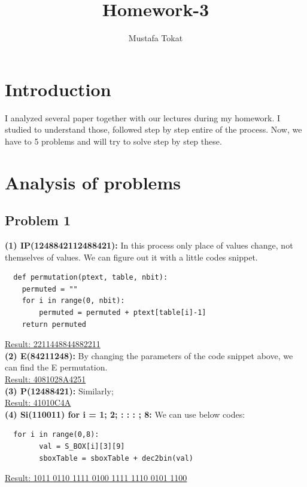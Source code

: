 \documentclass[11pt]{article}
\begin{document}
\title{Homework-3}
\author{Mustafa Tokat}
\maketitle
\section{Introduction}
I analyzed several paper together with our lectures during my homework. I studied to understand those, followed step by step entire of the process.
 Now, we have to 5 problems and will try to solve step by step these.
\section{Analysis of problems}
\subsection{Problem 1}
 
\textbf{(1) IP(1248842112488421):}
In this process only place of values change, not themselves of values. We can figure out it with a little codes snippet.
\lstset{language=Python}
\lstset{frame=lines}
\lstset{basicstyle=\footnotesize}
\begin{lstlisting}
  def permutation(ptext, table, nbit):
    permuted = ""
    for i in range(0, nbit):
        permuted = permuted + ptext[table[i]-1]
    return permuted
\end{lstlisting}
\underline{Result: 2211448844882211 }\\

\bigskip\textbf{(2) E(84211248): }
By changing the parameters of the code snippet above, we can find the E permutation.\\
\underline{Result: 4081028A4251}\\

\bigskip\textbf{(3) P(12488421): }
Similarly;\\
\underline{Result: 41010C4A}\\

\newpage\textbf{(4) Si(110011) for i = 1; 2; : : : ; 8:}
We can use below codes: 
\lstset{language=Python}
\lstset{frame=lines}
\lstset{basicstyle=\footnotesize}
\begin{lstlisting}
  for i in range(0,8):
        val = S_BOX[i][3][9]
        sboxTable = sboxTable + dec2bin(val)
\end{lstlisting}
\underline{Result: 1011 0110 1111 0100 1111 1110 0101 1100 }\\
\end{document}
